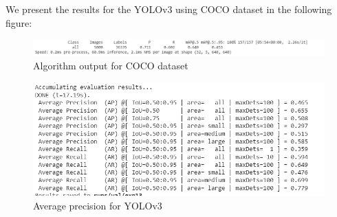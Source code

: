 \documentclass[runningheads,a4paper,11pt]{report}
\begin{document}
We present the results for the YOLOv3 using COCO dataset in the following figure:
\begin{figure}
    \centering
\includegraphics[width=16cm]{images/speed_yolo.PNG}   
    \caption{Algorithm output for COCO dataset}\label{fig:speedyolo}
\end{figure}
\begin{figure}
    \centering
\includegraphics[width=16cm]{images/average precision yolo.PNG} 
    \caption{Average precision for YOLOv3}\label{fig:apyolo}
\end{figure}
\end{document}
